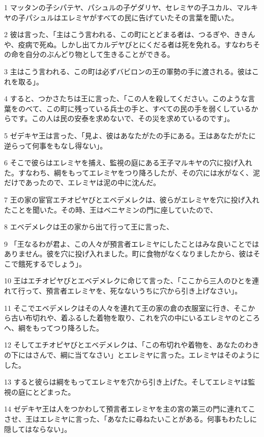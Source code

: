 \par 1 マッタンの子シパテヤ、パシュルの子ゲダリヤ、セレミヤの子ユカル、マルキヤの子パシュルはエレミヤがすべての民に告げていたその言葉を聞いた。
\par 2 彼は言った、「主はこう言われる、この町にとどまる者は、つるぎや、ききんや、疫病で死ぬ。しかし出てカルデヤびとにくだる者は死を免れる。すなわちその命を自分のぶんどり物として生きることができる。
\par 3 主はこう言われる、この町は必ずバビロンの王の軍勢の手に渡される。彼はこれを取る」。
\par 4 すると、つかさたちは王に言った、「この人を殺してください。このような言葉をのべて、この町に残っている兵士の手と、すべての民の手を弱くしているからです。この人は民の安泰を求めないで、その災を求めているのです」。
\par 5 ゼデキヤ王は言った、「見よ、彼はあなたがたの手にある。王はあなたがたに逆らって何事をもなし得ない」。
\par 6 そこで彼らはエレミヤを捕え、監視の庭にある王子マルキヤの穴に投げ入れた。すなわち、綱をもってエレミヤをつり降ろしたが、その穴には水がなく、泥だけであったので、エレミヤは泥の中に沈んだ。
\par 7 王の家の宦官エチオピヤびとエベデメレクは、彼らがエレミヤを穴に投げ入れたことを聞いた。その時、王はベニヤミンの門に座していたので、
\par 8 エベデメレクは王の家から出て行って王に言った、
\par 9 「王なるわが君よ、この人々が預言者エレミヤにしたことはみな良いことではありません。彼を穴に投げ入れました。町に食物がなくなりましたから、彼はそこで餓死するでしょう」。
\par 10 王はエチオピヤびとエベデメレクに命じて言った、「ここから三人のひとを連れて行って、預言者エレミヤを、死なないうちに穴から引き上げなさい」。
\par 11 そこでエベデメレクはその人々を連れて王の家の倉の衣服室に行き、そこから古い布切れや、着ふるした着物を取り、これを穴の中にいるエレミヤのところへ、綱をもってつり降ろした。
\par 12 そしてエチオピヤびとエベデメレクは、「この布切れや着物を、あなたのわきの下にはさんで、綱に当てなさい」とエレミヤに言った。エレミヤはそのようにした。
\par 13 すると彼らは綱をもってエレミヤを穴から引き上げた。そしてエレミヤは監視の庭にとどまった。
\par 14 ゼデキヤ王は人をつかわして預言者エレミヤを主の宮の第三の門に連れてこさせ、王はエレミヤに言った、「あなたに尋ねたいことがある。何事もわたしに隠してはならない」。
